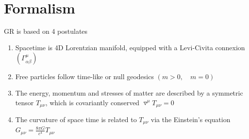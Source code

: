 \documentclass[a4paper]{book}
\theoremstyle{definition}
\theoremstyle{remark}
\begin{document}
\chapter{Formalism}

GR is based on 4 postulates 
\begin{enumerate}
    \item Spacetime is 4D Lorentzian manifold, equipped with a Levi-Civita connexion $(\Gamma^\mu_{\alpha\beta})$
    \item Free particles follow time-like or null geodesics $(m > 0, \quad m = 0)$
    \item The energy, momentum and stresses of matter are described by a symmetric tensor $T_{\mu\nu}$, which is covariantly conserved $\triangledown^\mu T_{\mu\nu} = 0$
    \item The curvature of space time is related to $T_{\mu\nu}$ via the Einstein's equation $G_{\mu\nu} = \frac{8\pi G}{c^4}T_{\mu\nu}$
\end{enumerate}
\end{document}
